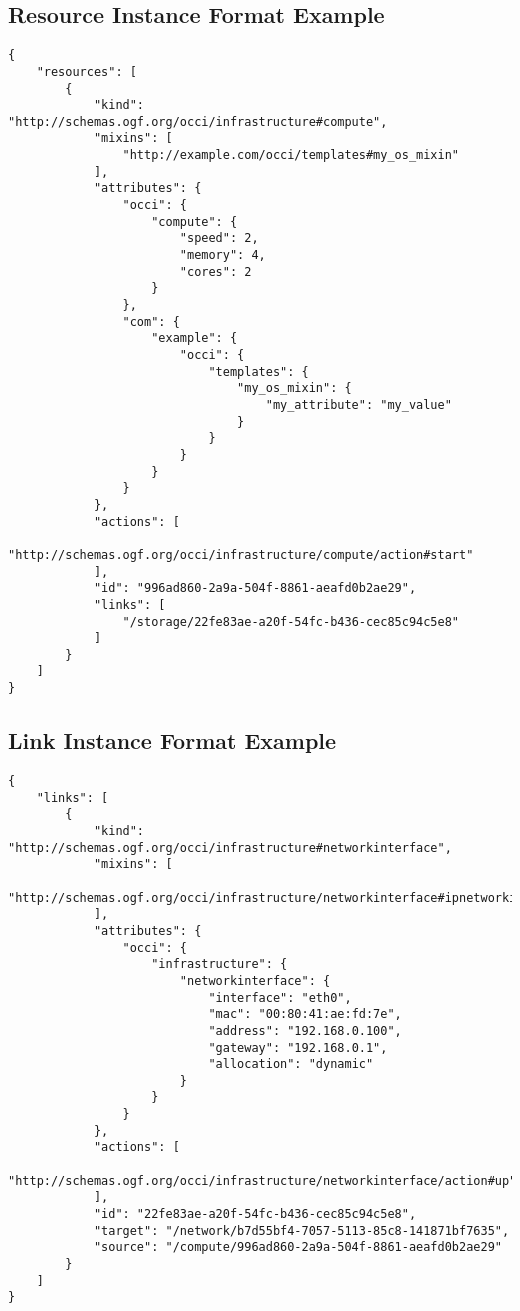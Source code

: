 \documentclass[10pt,a4paper]{article}
\begin{document}

\subsection{Resource Instance Format Example}
\label{sec:example_resource}

\begin{lstlisting}
{
    "resources": [
        {
            "kind": "http://schemas.ogf.org/occi/infrastructure#compute",
            "mixins": [
                "http://example.com/occi/templates#my_os_mixin"
            ],
            "attributes": {
                "occi": {
                    "compute": {
                        "speed": 2,
                        "memory": 4,
                        "cores": 2
                    }
                },
                "com": {
                    "example": {
                        "occi": {
                            "templates": {
                                "my_os_mixin": {
                                    "my_attribute": "my_value"
                                }
                            }
                        }
                    }
                }
            },
            "actions": [
                "http://schemas.ogf.org/occi/infrastructure/compute/action#start"
            ],
            "id": "996ad860-2a9a-504f-8861-aeafd0b2ae29",
            "links": [
                "/storage/22fe83ae-a20f-54fc-b436-cec85c94c5e8"
            ]
        }
    ]
}
\end{lstlisting}

\subsection{Link Instance Format Example}
\label{sec:example_link}

\begin{lstlisting}
{
    "links": [
        {
            "kind": "http://schemas.ogf.org/occi/infrastructure#networkinterface",
            "mixins": [
                "http://schemas.ogf.org/occi/infrastructure/networkinterface#ipnetworkinterface"
            ],
            "attributes": {
                "occi": {
                    "infrastructure": {
                        "networkinterface": {
                            "interface": "eth0",
                            "mac": "00:80:41:ae:fd:7e",
                            "address": "192.168.0.100",
                            "gateway": "192.168.0.1",
                            "allocation": "dynamic"
                        }
                    }
                }
            },
            "actions": [
                "http://schemas.ogf.org/occi/infrastructure/networkinterface/action#up"
            ],
            "id": "22fe83ae-a20f-54fc-b436-cec85c94c5e8",
            "target": "/network/b7d55bf4-7057-5113-85c8-141871bf7635",
            "source": "/compute/996ad860-2a9a-504f-8861-aeafd0b2ae29"
        }
    ]
}
\end{lstlisting}
\end{document}
